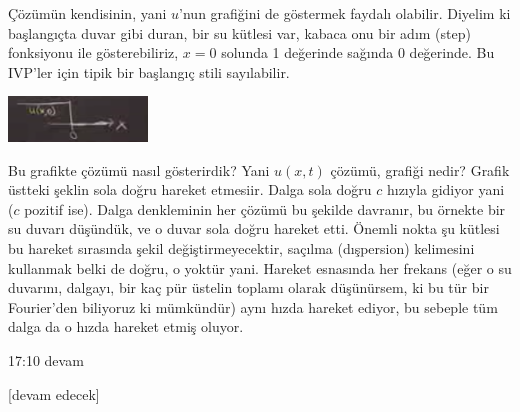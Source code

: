 \documentclass[12pt,fleqn]{article}\usepackage{../../common}
\begin{document}
Çözümün kendisinin, yani $u$'nun grafiğini de göstermek faydalı olabilir.
Diyelim ki başlangıçta duvar gibi duran, bir su kütlesi var, kabaca onu
bir adım (step) fonksiyonu ile gösterebiliriz, $x=0$ solunda 1 değerinde
sağında 0 değerinde. Bu IVP'ler için tipik bir başlangıç stili sayılabilir.

\includegraphics[width=10em]{compscieng_2_03_02.png}

Bu grafikte çözümü nasıl gösterirdik? Yani $u(x,t)$ çözümü, grafiği nedir?
Grafik üstteki şeklin sola doğru hareket etmesiir. Dalga sola doğru $c$ hızıyla
gidiyor yani ($c$ pozitif ise). Dalga denkleminin her çözümü bu şekilde
davranır, bu örnekte bir su duvarı düşündük, ve o duvar sola doğru hareket etti.
Önemli nokta şu kütlesi bu hareket sırasında şekil değiştirmeyecektir, saçılma
(dışpersion) kelimesini kullanmak belki de doğru, o yoktür yani. Hareket
esnasında her frekans (eğer o su duvarını, dalgayı, bir kaç pür üstelin toplamı
olarak düşünürsem, ki bu tür bir Fourier'den biliyoruz ki mümkündür) aynı
hızda hareket ediyor, bu sebeple tüm dalga da o hızda hareket etmiş oluyor. 

17:10 devam 

















[devam edecek]
\end{document}
